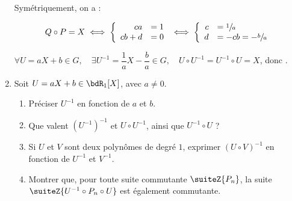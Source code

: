 \documentclass[a4paper,french,bookmarks]{article}
\begin{document}
\begin{enumerate}
{        Symétriquement, on a :
        
        \[Q \circ P = X \iff  \left\lbrace\begin{array}{rl}
            ca &= 1  \\
            cb+d &= 0
        \end{array}\right.\iff\left\lbrace\begin{array}{rl}
            c &= \sfrac{1}{a}  \\
            d &= -cb = -\sfrac{b}{a}
        \end{array}\right.\]
        
        $\forall U = aX + b\in G,\quad \exists U^{-1} = \dfrac{1}{a}X - \dfrac{b}{a}\in G,\quad U \circ U^{-1} = U^{-1} \circ U = X$, donc .
    }
    
    \item Soit $U = aX + b \in \bdR_1[X]$, avec $a \neq 0$.
    
    \begin{enumerate}
        \item Préciser $U^{-1}$ en fonction de $a$ et $b$.
        
        
        \item Que valent $(U^{-1})^{-1}$ et $U \circ U^{-1}$, ainsi que $U^{-1} \circ U$ ?
        
        
        \item Si $U$ et $V$ sont deux polynômes de degré $1$, exprimer $(U \circ V)^{-1}$ en fonction de $U^{-1}$ et $V^{-1}$.
        
        
        \item\label{question2:4:d} Montrer que, pour toute suite commutante $\suiteZ{P_n}$, la suite $\suiteZ{U^{-1} \circ P_n \circ U}$ est également commutante.
        
\end{enumerate}
\end{enumerate}
\end{document}
